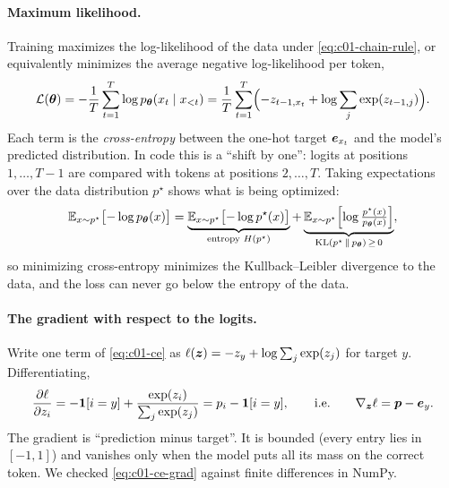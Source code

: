 \paragraph{Maximum likelihood.} Training maximizes the log-likelihood of the data under
\eqref{eq:c01-chain-rule}, or equivalently minimizes the average negative log-likelihood per
token,
\begin{equation}\label{eq:c01-ce}
  \mathcal{L}(\bm{\theta})
  = -\frac{1}{T}\sum_{t=1}^{T} \log p_{\bm{\theta}}(x_t \mid x_{<t})
  = \frac{1}{T}\sum_{t=1}^{T}\Bigl( -z_{t-1,x_t} + \log \sum_{j} \exp(z_{t-1,j}) \Bigr).
\end{equation}
Each term is the \emph{cross-entropy} between the one-hot target $\bm{e}_{x_t}$ and the model's
predicted distribution. In code this is a ``shift by one'': logits at positions
$1, \dots, T-1$ are compared with tokens at positions $2, \dots, T$. Taking expectations over
the data distribution $p^\star$ shows what is being optimized:
\[
  \mathbb{E}_{x \sim p^\star}\bigl[-\log p_{\bm{\theta}}(x)\bigr]
  = \underbrace{\mathbb{E}_{x\sim p^\star}\bigl[-\log p^\star(x)\bigr]}_{\text{entropy } H(p^\star)}
  + \underbrace{\mathbb{E}_{x\sim p^\star}\Bigl[\log \tfrac{p^\star(x)}{p_{\bm{\theta}}(x)}\Bigr]}_{\mathrm{KL}(p^\star \,\|\, p_{\bm{\theta}}) \,\ge\, 0},
\]
so minimizing cross-entropy minimizes the Kullback--Leibler divergence to the data, and the
loss can never go below the entropy of the data.

\paragraph{The gradient with respect to the logits.} Write one term of \eqref{eq:c01-ce} as
$\ell(\bm{z}) = -z_y + \log\sum_j \exp(z_j)$ for target $y$. Differentiating,
\begin{equation}\label{eq:c01-ce-grad}
  \frac{\partial \ell}{\partial z_i}
  = -\mathbf{1}[i = y] + \frac{\exp(z_i)}{\sum_j \exp(z_j)}
  = p_i - \mathbf{1}[i = y],
  \qquad\text{i.e.}\qquad
  \nabla_{\bm{z}}\ell = \bm{p} - \bm{e}_y .
\end{equation}
The gradient is ``prediction minus target''. It is bounded (every entry lies in $[-1, 1]$)
and vanishes only when the model puts all its mass on the correct token. We checked
\eqref{eq:c01-ce-grad} against finite differences in NumPy.

